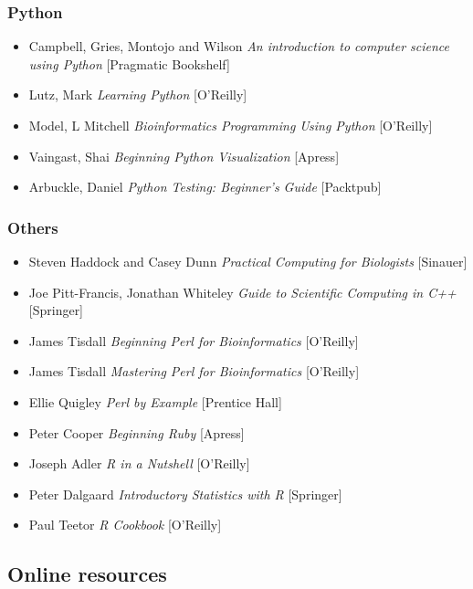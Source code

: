 \documentclass[ChapterTOCs,krantz2]{krantz} %
\begin{document}
\subsubsection{Python}
\begin{itemize}
\item Campbell, Gries, Montojo and Wilson \emph{An introduction to computer
science using Python} [Pragmatic Bookshelf]
\item Lutz, Mark \emph{Learning Python} [O'Reilly]
\item Model, L Mitchell \emph{Bioinformatics Programming Using Python} [O'Reilly]
\item Vaingast, Shai \emph{Beginning Python Visualization} [Apress]
\item Arbuckle, Daniel  \emph{Python Testing: Beginner’s Guide} [Packtpub]
\end{itemize}

\subsubsection{Others}
\begin{itemize}
\item Steven Haddock and Casey Dunn \emph{Practical Computing for Biologists} [Sinauer]
\item Joe Pitt-Francis, Jonathan Whiteley \emph{Guide to Scientific Computing in C++} [Springer]
\item James Tisdall \emph{Beginning Perl for Bioinformatics} [O'Reilly]
\item James Tisdall \emph{Mastering Perl for Bioinformatics} [O'Reilly]
\item Ellie Quigley \emph{Perl by Example} [Prentice Hall]
\item Peter Cooper \emph{Beginning Ruby} [Apress]
\item Joseph Adler \emph{R in a Nutshell} [O'Reilly]
\item Peter Dalgaard \emph{Introductory Statistics with R} [Springer]
\item Paul Teetor \emph{R Cookbook} [O'Reilly]
\end{itemize}

\subsection{Online resources}
\end{document}
